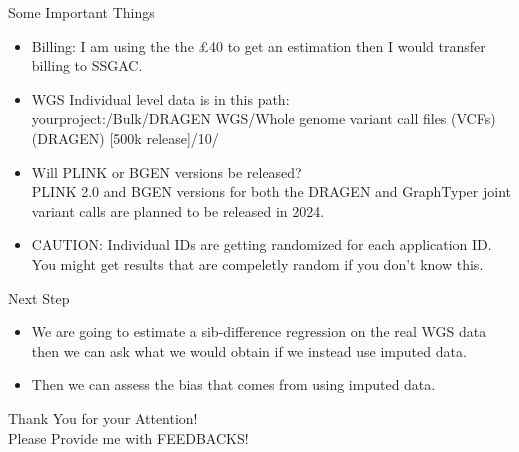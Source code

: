 \documentclass{beamer}
\begin{document}
\begin{frame}{Some Important Things}

      \begin{itemize}
            \item Billing: I am using the the \pounds 40 to get an estimation then I would 
            transfer billing to SSGAC.
            \item WGS Individual level data is in this path:
            \\yourproject:/Bulk/DRAGEN WGS/Whole genome variant call files (VCFs) (DRAGEN) [500k release]/10/
            \item Will PLINK or BGEN versions be released?
            \\ PLINK 2.0 and BGEN versions for both the DRAGEN and GraphTyper joint variant calls are planned to
            be released in 2024.
            \item CAUTION: Individual IDs are getting randomized for each application ID.
            You might get results that are compeletly random if you don't know this.
      \end{itemize}

\end{frame}


\begin{frame}{Next Step}

      \begin{itemize}
            \item We are going to estimate a sib-difference regression on the
            real WGS data then we can ask what we would obtain if we instead use
            imputed data.
            \item Then we can assess the bias that comes from using imputed data.
            
      \end{itemize}

\end{frame}


\begin{frame}

      \centering
      \huge{Thank You for your Attention!} \\ 
      \huge{Please Provide me with FEEDBACKS!}

\end{frame}
\end{document}
